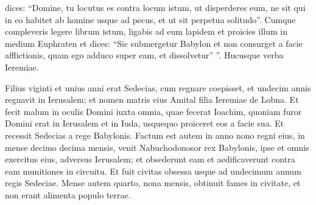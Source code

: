 \begin{biblechapter}
\begin{biblechapter}
\begin{biblechapter}
\begin{biblechapter}
\begin{biblechapter}
\begin{biblechapter}
\begin{biblechapter}
\begin{biblechapter}
\begin{biblechapter}
\begin{biblechapter}
\begin{biblechapter}
\begin{biblechapter}
\begin{biblechapter}
\begin{biblechapter}
\begin{biblechapter}
\begin{biblechapter}
\begin{biblechapter}
\begin{biblechapter}
\begin{biblechapter}
\begin{biblechapter}
\begin{biblechapter}
\begin{biblechapter}
\begin{biblechapter}
\begin{biblechapter}
\begin{biblechapter}
\begin{biblechapter}
\begin{biblechapter}
\begin{biblechapter}
\begin{biblechapter}
\begin{biblechapter}
\begin{biblechapter}
\begin{biblechapter}
\begin{biblechapter}
\begin{biblechapter}
\begin{biblechapter}
\begin{biblechapter}
\begin{biblechapter}
\begin{biblechapter}
\begin{biblechapter}
\begin{biblechapter}
\begin{biblechapter}
\begin{biblechapter}
\begin{biblechapter}
\begin{biblechapter}
\begin{biblechapter}
\begin{biblechapter}
\begin{biblechapter}
\begin{biblechapter}
\begin{biblechapter}
\begin{biblechapter}
\begin{biblechapter}
 \verse dices: “Domine, tu locutus es contra locum istum, ut disperderes eum, ne sit qui in eo habitet ab homine usque ad pecus, et ut sit perpetua solitudo”. 
\verse Cumque compleveris legere librum istum, ligabis ad eum lapidem et proicies illum in medium Euphraten 
\verse et dices: “Sic submergetur Babylon et non consurget a facie afflictionis, quam ego adduco super eam, et dissolvetur” ”.
 Hucusque verba Ieremiae.
 
\begin{biblechapter}
\verse Filius viginti et unius anni erat Sedecias, cum regnare coepisset, et undecim annis regnavit in Ierusalem; et nomen matris eius Amital filia Ieremiae de Lobna. 
\verse Et fecit malum in oculis Domini iuxta omnia, quae fecerat Ioachim, 
\verse quoniam furor Domini erat in Ierusalem et in Iuda, usquequo proiceret eos a facie sua.
 Et recessit Sedecias a rege Babylonis. 
\verse Factum est autem in anno nono regni eius, in mense decimo decima mensis, venit Nabuchodonosor rex Babylonis, ipse et omnis exercitus eius, adversus Ierusalem; et obsederunt eam et aedificaverunt contra eam munitiones in circuitu. 
\verse Et fuit civitas obsessa usque ad undecimum annum regis Sedeciae. 
\verse Mense autem quarto, nona mensis, obtinuit fames in civitate, et non erant alimenta populo terrae. 

\end{biblechapter}
\end{biblechapter}
\end{biblechapter}
\end{biblechapter}
\end{biblechapter}
\end{biblechapter}
\end{biblechapter}
\end{biblechapter}
\end{biblechapter}
\end{biblechapter}
\end{biblechapter}
\end{biblechapter}
\end{biblechapter}
\end{biblechapter}
\end{biblechapter}
\end{biblechapter}
\end{biblechapter}
\end{biblechapter}
\end{biblechapter}
\end{biblechapter}
\end{biblechapter}
\end{biblechapter}
\end{biblechapter}
\end{biblechapter}
\end{biblechapter}
\end{biblechapter}
\end{biblechapter}
\end{biblechapter}
\end{biblechapter}
\end{biblechapter}
\end{biblechapter}
\end{biblechapter}
\end{biblechapter}
\end{biblechapter}
\end{biblechapter}
\end{biblechapter}
\end{biblechapter}
\end{biblechapter}
\end{biblechapter}
\end{biblechapter}
\end{biblechapter}
\end{biblechapter}
\end{biblechapter}
\end{biblechapter}
\end{biblechapter}
\end{biblechapter}
\end{biblechapter}
\end{biblechapter}
\end{biblechapter}
\end{biblechapter}
\end{biblechapter}
\end{biblechapter}

